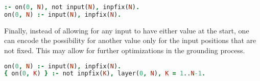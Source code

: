 \begin{lstlisting}[language=Prolog, numbers=none]
:- on(0, N), not input(N), inpfix(N).
on(0, N) :- input(N), inpfix(N).
\end{lstlisting}

Finally, instead of allowing for any input to have either value at the start,
one can encode the possibility for another value only for the input positions
that are not fixed. This may allow for further optimizations in the grounding process.

\begin{lstlisting}[language=Prolog, numbers=none]
on(0, N) :- input(N), inpfix(N).
{ on(0, K) } :- not inpfix(K), layer(0, N), K = 1..N-1.
\end{lstlisting}
